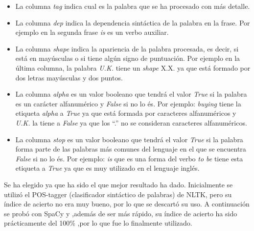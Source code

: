 \begin{itemize}
	\item La columna \textit{tag} indica cual es la palabra que se ha procesado con más detalle.
	\item La columna \textit{dep} indica la dependencia sintáctica de la palabra en la frase. Por ejemplo en la segunda frase \textit{is} es un verbo auxiliar.
	\item La columna \textit{shape} indica la apariencia de la palabra procesada, es decir, si está en mayúsculas o si tiene algún signo de puntuación. Por ejemplo en la última columna, la palabra \textit{U.K.} tiene un \textit{shape} X.X. ya que está formado por dos letras mayúsculas y dos puntos.
	\item La columna \textit{alpha} es un valor booleano que tendrá el valor \textit{True} si la palabra es un carácter alfanumérico y \textit{False} si no lo és. Por ejemplo: \textit{buying} tiene la etiqueta \textit{alpha} a \textit{True} ya que está formada por caracteres alfanuméricos y \textit{U.K.} la tiene a \textit{False} ya que los ``.'' no se consideran caracteres alfanuméricos.
	\item La columna \textit{stop} es un valor booleano que tendrá el valor \textit{True} si la palabra forma parte de las palabras más comunes del lenguaje en el que se encuentra \textit{False} si no lo és. Por ejemplo: \textit{is} que es una forma del verbo \textit{to be} tiene esta etiqueta a \textit{True} ya que es muy utilizado en el lenguaje inglés.
\end{itemize}

Se ha elegido ya que ha sido el que mejor resultado ha dado. Inicialmente se utilizó el POS-tagger (clasificador sintáctico de palabras) de NLTK, pero su índice de acierto no era muy bueno, por lo que se descartó su uso. A continuación se probó con SpaCy y ,además de ser más rápido, su índice de acierto ha sido prácticamente del 100\% ,por lo que fue lo finalmente utilizado.

